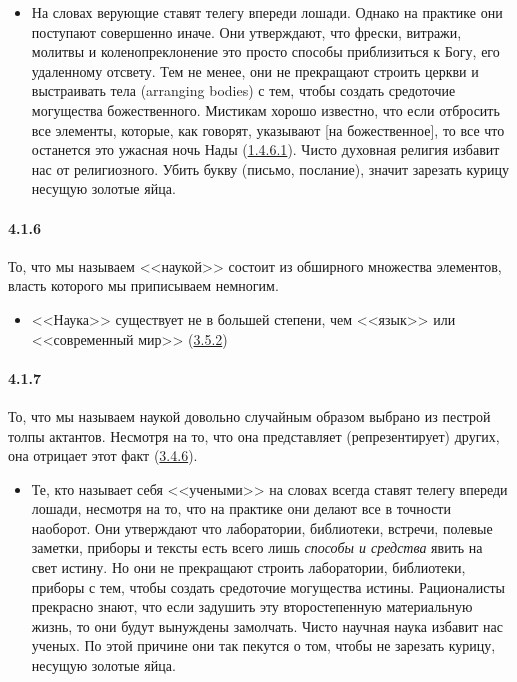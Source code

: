 	\begin{itemize}
	\item 
	На словах верующие ставят телегу впереди лошади. Однако на практике они поступают совершенно иначе. Они утверждают, что фрески, витражи, молитвы и коленопреклонение это просто способы приблизиться к Богу, его удаленному отсвету. Тем не менее, они не прекращают строить церкви и выстраивать тела (arranging bodies) с тем, чтобы создать средоточие могущества божественного. Мистикам хорошо известно, что если отбросить все элементы, которые, как говорят, указывают [на божественное], то все что останется это ужасная ночь Нады (\hyperlink{par:1.4.6.1}{1.4.6.1}). Чисто духовная религия избавит нас от религиозного. Убить букву (письмо, послание), значит зарезать курицу несущую золотые яйца.
	\end{itemize}	


\paragraph{4.1.6}\hypertarget{par:4.1.6}{} То, что мы называем <<наукой>> состоит из обширного множества элементов, власть которого мы приписываем немногим. 
	\begin{itemize}
	\item 
	<<Наука>> существует не в большей степени, чем <<язык>> или <<современный мир>> (\hyperlink{par:3.5.2}{3.5.2})
	\end{itemize}	


\paragraph{4.1.7}\hypertarget{par:4.1.7}{} То, что мы называем наукой довольно случайным образом выбрано из пестрой толпы актантов. Несмотря на то, что она представляет (репрезентирует) других, она отрицает этот факт (\hyperlink{par:3.4.6}{3.4.6}). 
	\begin{itemize}
	\item 
	Те, кто называет себя <<учеными>> на словах всегда ставят телегу впереди лошади, несмотря на то, что на практике они делают все в точности наоборот. Они утверждают что лаборатории, библиотеки, встречи, полевые заметки, приборы и тексты есть всего лишь {\itshape способы и средства} явить на свет истину. Но они не прекращают строить лаборатории, библиотеки, приборы с тем, чтобы создать средоточие могущества истины. Рационалисты прекрасно знают, что если задушить эту второстепенную материальную жизнь, то они будут вынуждены замолчать. Чисто научная наука избавит нас ученых. По этой причине они так пекутся о том, чтобы не зарезать курицу, несущую золотые яйца.
	\end{itemize}	


